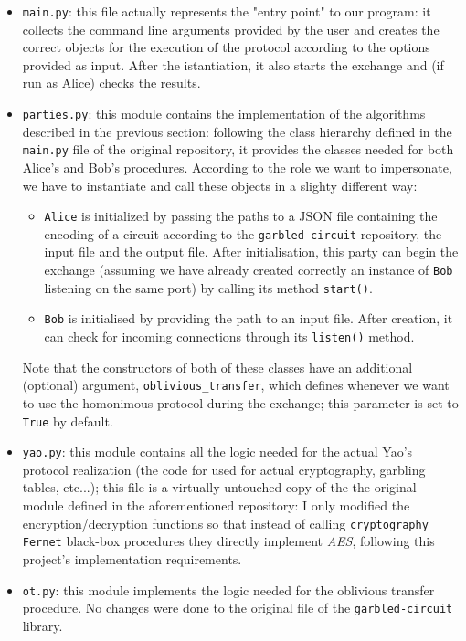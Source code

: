 \documentclass[12pt]{article}
\begin{document}
\begin{itemize}
  \item \texttt{main.py}: this file actually represents the "entry point" to our program: it collects the command line arguments provided by the user and creates the correct objects for the execution of the protocol according to the options provided as input. After the istantiation, it also starts the exchange and (if run as Alice) checks the results.
  \item \texttt{parties.py}: this module contains the implementation of the algorithms described in the previous section: following the class hierarchy defined in the \texttt{main.py} file of the original repository, it provides the classes needed for both Alice's and Bob's procedures. According to the role we want to impersonate, we have to instantiate and call these objects in a slighty different way:
  \begin{itemize}
    \item \texttt{Alice} is initialized by passing the paths to a JSON file containing the encoding of a circuit according to the \texttt{garbled-circuit} repository, the input file and the output file. After initialisation, this party can begin the exchange (assuming we have already created correctly an instance of \texttt{Bob} listening on the same port) by calling its method \texttt{start()}.
    \item \texttt{Bob} is initialised by providing the path to an input file. After creation, it can check for incoming connections through its \texttt{listen()} method.
  \end{itemize}
  Note that the constructors of both of these classes have an additional (optional) argument, \texttt{oblivious\_transfer}, which defines whenever we want to use the homonimous protocol during the exchange; this parameter is set to \texttt{True} by default.
  \item \texttt{yao.py}: this module contains all the logic needed for the actual Yao's protocol realization (the code for used for actual cryptography, garbling tables, etc...); this file is a virtually untouched copy of the the original module defined in the aforementioned repository: I only modified the encryption/decryption functions so that instead of calling \texttt{cryptography} \cite{CRYPTO} \texttt{Fernet} black-box procedures they directly implement \textit{AES}, following this project's implementation requirements.
  \item \texttt{ot.py}: this module implements the logic needed for the oblivious transfer procedure. No changes were done to the original file of the \texttt{garbled-circuit} library.

\end{itemize}
\end{document}
